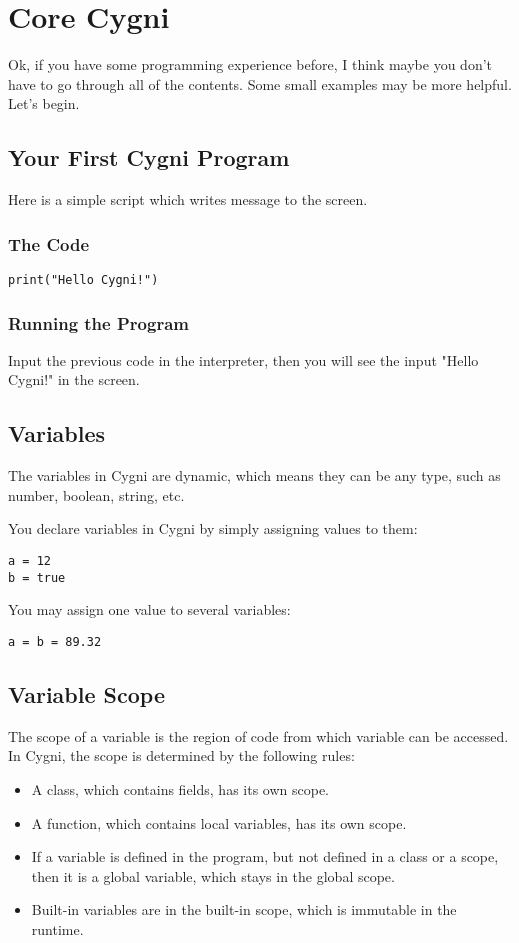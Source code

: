\chapter{Core Cygni}
Ok, if you have some programming experience before, I think maybe you don't have to go through all of the contents. Some small examples may be more helpful. Let's begin.

\section{Your First Cygni Program}
Here is a simple script which writes message to the screen.

\subsection{The Code}
\begin{lstlisting}
print("Hello Cygni!")
\end{lstlisting}

\subsection{Running the Program}
Input the previous code in the interpreter, then you will see the input "Hello Cygni!" in the screen.
\section{Variables}
The variables in Cygni are dynamic, which means they can be any type, such as number, boolean, string, etc.

You declare variables in Cygni by simply assigning values to them:

\begin{lstlisting}
a = 12
b = true
\end{lstlisting}

You may assign one value to several variables:
\begin{lstlisting}
a = b = 89.32
\end{lstlisting}

\section{Variable Scope}
The scope of a variable is the region of code from which variable can be accessed. In Cygni, the scope is determined by the following rules:
\begin{itemize}
	\item A class, which contains fields, has its own scope.
	\item A function, which contains local variables, has its own scope.
	\item If a variable is defined in the program, but not defined in a class or a scope, then it is a global variable, which stays in the global scope.
	\item Built-in variables are in the built-in scope, which is immutable in the runtime.
\end{itemize}

